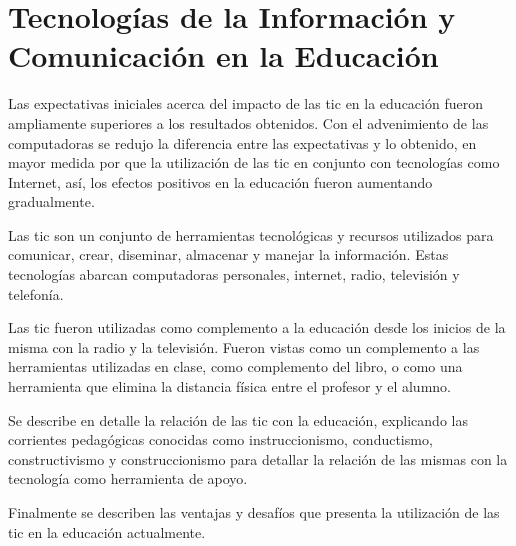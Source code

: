 \chapter[TIC's en la Educación]{Tecnologías de la Información y Comunicación en
    la Educación}
\label{chap:tics}

Las expectativas iniciales acerca del impacto de las \Gls{tic} en la educación
fueron ampliamente superiores a los resultados obtenidos\cite{unesco:ict}. Con
el advenimiento de las computadoras se redujo la diferencia entre las
expectativas y lo obtenido, en mayor medida por que la utilización de las
\Gls{tic} en conjunto con tecnologías como Internet, así, los efectos positivos
en la educación fueron aumentando gradualmente\cite{unesco:ict}.

Las \Gls{tic} son un conjunto de herramientas tecnológicas y recursos utilizados
para comunicar, crear, diseminar, almacenar y manejar la
información\cite{unesco:ict}. Estas tecnologías abarcan computadoras personales,
internet, radio, televisión y telefonía\cite{tinio:ict}.

Las \Gls{tic} fueron utilizadas como complemento a la educación desde los
inicios de la misma con la radio y la televisión. Fueron vistas como un
complemento a las herramientas utilizadas en clase, como complemento del libro,
o como una herramienta que elimina la distancia física entre el profesor y el
alumno\cite{unesco:ict}. 

Se describe en detalle la relación de las \Gls{tic} con la educación,
explicando las corrientes pedagógicas conocidas como instruccionismo,
conductismo, constructivismo y construccionismo para detallar la relación de las
mismas con la tecnología como herramienta de apoyo.

Finalmente se describen las ventajas y desafíos que presenta la utilización de
las \Gls{tic} en la educación actualmente.






% 

